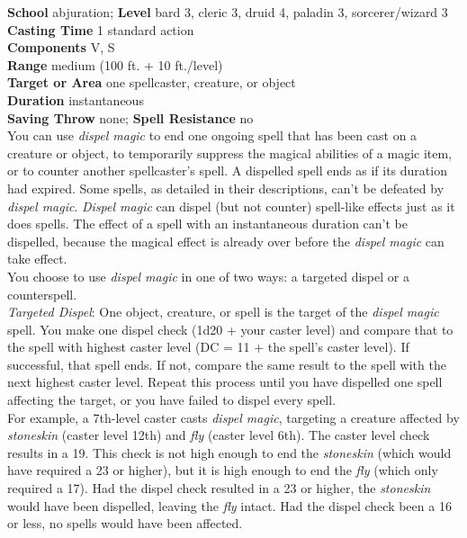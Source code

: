 \textbf{School} abjuration; \textbf{Level} bard 3, cleric 3, druid 4, paladin 3, sorcerer/wizard 3\\
\textbf{Casting Time} 1 standard action\\
\textbf{Components} V, S\\
\textbf{Range }medium (100 ft. + 10 ft./level)\\
\textbf{Target or Area} one spellcaster, creature, or object\\
\textbf{Duration} instantaneous\\
\textbf{Saving Throw} none; \textbf{Spell Resistance} no\\
You can use \textit{dispel magic }to end one ongoing spell that has been cast on a creature or object, to temporarily suppress the magical abilities of a magic item, or to counter another spellcaster's spell. A dispelled spell ends as if its duration had expired. Some spells, as detailed in their descriptions, can't be defeated by \textit{dispel magic}. \textit{Dispel magic }can dispel (but not counter) spell-like effects just as it does spells. The effect of a spell with an instantaneous duration can't be dispelled, because the magical effect is already over before the \textit{dispel magic }can take effect. \\
You choose to use \textit{dispel magic }in one of two ways: a targeted dispel or a counterspell.\\
\textit{Targeted Dispel}: One object, creature, or spell is the target of the \textit{dispel magic }spell. You make one dispel check (1d20 + your caster level) and compare that to the spell with highest caster level (DC = 11 + the spell's caster level). If successful, that spell ends. If not, compare the same result to the spell with the next highest caster level. Repeat this process until you have dispelled one spell affecting the target, or you have failed to dispel every spell.\\
 For example, a 7th-level caster casts \textit{dispel magic}, targeting a creature affected by \textit{stoneskin }(caster level 12th) and \textit{fly} (caster level 6th). The caster level check results in a 19. This check is not high enough to end the \textit{stoneskin} (which would have required a 23 or higher), but it is high enough to end the \textit{fly} (which only required a 17). Had the dispel check resulted in a 23 or higher, the \textit{stoneskin} would have been dispelled, leaving the \textit{fly }intact. Had the dispel check been a 16 or less, no spells would have been affected.\\
